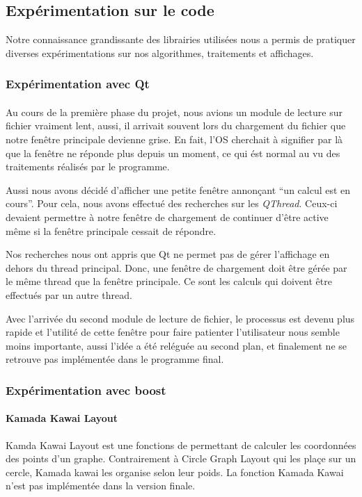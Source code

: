 

\subsection{Expérimentation sur le code}
Notre connaissance grandissante des librairies utilisées nous a permis de pratiquer diverses expérimentations sur nos algorithmes, traitements et affichages.
\subsubsection{Expérimentation avec Qt}
\paragraph{}
Au cours de la premi\`ere phase du projet, nous avions un module de lecture sur fichier vraiment lent, aussi, il arrivait souvent lors du chargement du fichier que notre fen\^etre principale devienne grise. En fait, l'OS cherchait \`a signifier par l\`a que la fen\^etre ne réponde plus depuis un moment, ce qui \'est normal au vu des traitements réalisés par le programme.

Aussi nous avons décidé d'afficher une petite fen\^etre annon\c cant ``un calcul est en cours''. Pour cela, nous avons effectué des recherches sur les \textit{QThread}. Ceux-ci devaient permettre \`a notre fen\^etre de chargement de continuer d'\^etre active m\^eme si la fen\^etre principale cessait de répondre.

Nos recherches nous ont appris que Qt ne permet pas de gérer l'affichage en dehors du thread principal. Donc, une fen\^etre de chargement doit être g\'er\'ee par le m\^eme thread que la fen\^etre principale. Ce sont les calculs qui doivent \^etre effectu\'es par un autre thread.

Avec l'arriv\'ee du second module de lecture de fichier, le processus est devenu plus rapide et l'utilit\'e de cette fen\^etre pour faire patienter l'utilisateur nous semble moins importante, aussi l'id\'ee a été rel\'egu\'ee au second plan, et finalement ne se retrouve pas impl\'ement\'ee dans le programme final.

\subsubsection{Expérimentation avec boost}

\paragraph{Kamada Kawai Layout}
Kamda Kawai Layout est une fonctions de \boost permettant de calculer les coordonn\'ees des points d'un graphe. Contrairement \`a Circle Graph Layout qui les pla\c ce sur un cercle, Kamada kawai les organise selon leur poids.
La fonction Kamada Kawai n'est pas impl\'ement\'ee dans la version finale.

